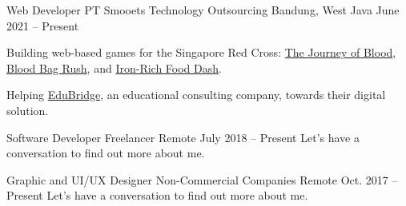 


\begin{cventries}


\cventry
{Web Developer} %
{PT Smooets Technology Outsourcing} %
{Bandung, West Java} %
{June 2021 -- Present} %
{ %
\begin{cvitems}
\item {Building web-based games for the Singapore Red Cross: \href{https://giveblood.sg/discover/}{The Journey of Blood}, \href{https://giveblood.sg/blood-bag-rush/}{Blood Bag Rush}, and \href{https://giveblood.sg/iron-rich-food/}{Iron-Rich Food Dash}.}
\item {Helping \href{https://www.edubridge.co.id/}{EduBridge}, an educational consulting company, towards their digital solution.}
\end{cvitems}
}


\cventry
{Software Developer} %
{Freelancer} %
{Remote} %
{July 2018 -- Present} %
{ %
Let's have a conversation to find out more about me.
}


\cventry
{Graphic and UI/UX Designer} %
{Non-Commercial Companies} %
{Remote} %
{Oct. 2017 -- Present} %
{ %
Let's have a conversation to find out more about me.
}




\end{cventries}
